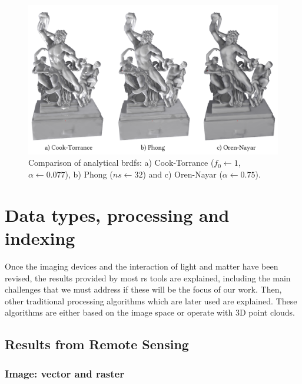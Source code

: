 \begin{figure}[ht]
	\includegraphics[width=\textwidth]{figs/fundamentals/analytical_brdf.png}
	\caption{Comparison of analytical \acrshort{brdf}s: a) Cook-Torrance ($f_0 \gets 1$, $\alpha \gets 0.077$), b) Phong ($ns \gets 32$) and c) Oren-Nayar ($\alpha \gets 0.75$). }
    \label{fig:analytical_brdf}
\end{figure}


\section{Data types, processing and indexing}

Once the imaging devices and the interaction of light and matter have been revised, the results provided by most \acrshort{rs} tools are explained, including the main challenges that we must address if these will be the focus of our work. Then, other traditional processing algorithms which are later used are explained. These algorithms are either based on the image space or operate with 3D point clouds.

\subsection{Results from Remote Sensing}

\subsubsection{Image: vector and raster}
\label{sec:rs_data_formats}

